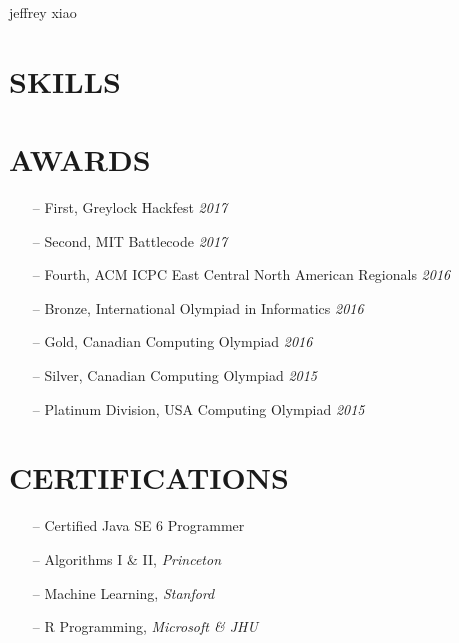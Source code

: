 \documentclass{resume}
\begin{document}
  \header%
    {jeffrey}%
    {xiao}%
    {}%
    {}%
  \begin{sidebar}
    \section{SKILLS}
    \section{AWARDS}
      \begin{itemize}[leftmargin=0.45cm, topsep=0.0cm]%
        \item[--] First, Greylock Hackfest \separator\emph{2017}
        \item[--] Second, MIT Battlecode \separator\emph{2017}
        \item[--] Fourth, ACM ICPC East Central North American Regionals \separator\emph{2016}
        \item[--] Bronze, International Olympiad in Informatics \separator\emph{2016}
        \item[--] Gold, Canadian Computing Olympiad \separator\emph{2016}
        \item[--] Silver, Canadian Computing Olympiad \separator\emph{2015}
        \item[--] Platinum Division, USA Computing Olympiad \separator\emph{2015}
      \end{itemize}%
    \section{CERTIFICATIONS}
      \begin{itemize}[leftmargin=0.45cm, noitemsep, topsep=0.0cm]%
        \item[--] Certified Java SE 6 Programmer
        \item[--] Algorithms I \& II, \emph{Princeton}
        \item[--] Machine Learning, \emph{Stanford}
        \item[--] R Programming, \emph{Microsoft \& JHU }
      \end{itemize}%

\end{sidebar}
\end{document}
